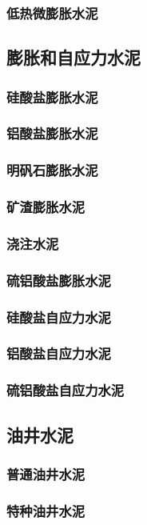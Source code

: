 \documentclass[UTF8]{../../ApplicationUniverse}
\begin{document}
        \subsubsection{低热微膨胀水泥}
    \subsection{膨胀和自应力水泥}
        \subsubsection{硅酸盐膨胀水泥}
        \subsubsection{铝酸盐膨胀水泥}
        \subsubsection{明矾石膨胀水泥}
        \subsubsection{矿渣膨胀水泥}
        \subsubsection{浇注水泥}
        \subsubsection{硫铝酸盐膨胀水泥}
        \subsubsection{硅酸盐自应力水泥}
        \subsubsection{铝酸盐自应力水泥}
        \subsubsection{硫铝酸盐自应力水泥}
    \subsection{油井水泥}
        \subsubsection{普通油井水泥}
        \subsubsection{特种油井水泥}
\end{document}
